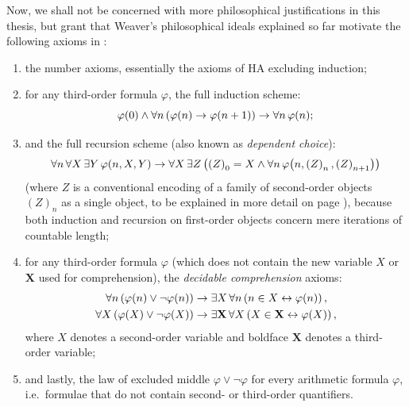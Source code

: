 \documentclass[12pt,openany]{book}
\theoremstyle{plain}
\theoremstyle{definition}
\newcommand\uplabel[1]{\textup{(#1)}}
\newcommand\opA[1]{\mathop{\forall #1}}
\newcommand\opE[1]{\mathop{\exists #1}}
\newcommand\HA{\mathrm{HA}}
\begin{document}
Now, we shall not be concerned with more philosophical justifications in this thesis, but grant that Weaver's philosophical ideals explained so far motivate the following axioms in \cite{weaver09-cm}:
\begin{enumerate}[label=\uplabel{\arabic*},series=cm-axioms]
  \item \label{itm:cm-num-axiom} the number axioms, essentially the axioms of $\HA$ excluding induction;
  \item \label{itm:cm-ind-axiom} for any third-order formula $\varphi$, the full induction scheme:
        \[\varphi\mleft(0\mright) \land \opA{n} \left(\varphi\mleft(n\mright) \rightarrow \varphi\mleft(n + 1\mright)\right) \rightarrow \opA{n} \varphi\mleft(n\mright);\]
  \item \label{itm:cm-rec-axiom} and the full recursion scheme (also known as \emph{dependent choice}):
        \[\opA{n} \opA{X} \opE{Y} \varphi\mleft(n, X, Y\mright) \rightarrow \opA{X} \opE{Z} \left(\left(Z\right)_0 = X \land \opA{n} \varphi\mleft(n, \left(Z\right)_n, \left(Z\right)_{n + 1}\mright)\right)\]
        (where $Z$ is a conventional encoding of a family of second-order objects $\left(Z\right)_n$ as a single object, to be explained in more detail on page \pageref{loc:arith-set-slice}), because both induction and recursion on first-order objects concern mere iterations of countable length;
  \item \label{itm:cm-dec-comp-axiom} for any third-order formula $\varphi$ (which does not contain the new variable $X$ or $\mathbf{X}$ used for comprehension), the \emph{decidable comprehension} axioms:
        \begin{align*}
          \opA{n} \left(\varphi\mleft(n\mright) \lor \neg \varphi\mleft(n\mright)\right) & \rightarrow \opE{X} \opA{n} \left(n \in X \leftrightarrow \varphi\mleft(n\mright)\right),                   \\
          \opA{X} \left(\varphi\mleft(X\mright) \lor \neg \varphi\mleft(X\mright)\right) & \rightarrow \opE{\mathbf{X}} \opA{X} \left(X \in \mathbf{X} \leftrightarrow \varphi\mleft(X\mright)\right),
        \end{align*}
        where $X$ denotes a second-order variable and boldface $\mathbf{X}$ denotes a third-order variable;
  \item \label{itm:cm-arith-dec-axiom} and lastly, the law of excluded middle $\varphi \lor \neg \varphi$ for every arithmetic formula $\varphi$, i.e.\ formulae that do not contain second- or third-order quantifiers.
        \xdef\cmarithdecaxiomlabel{\arabic{enumi}}
\end{enumerate}
\end{document}
